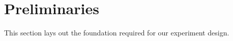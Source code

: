 \documentclass[runningheads]{llncs}
\begin{document}


\section{Preliminaries}\label{prelim}

This section lays out the foundation required for our experiment design. 
\end{document}
